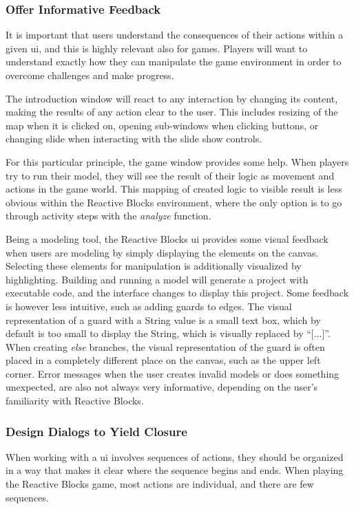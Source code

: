 \subsubsection{Offer Informative Feedback}
It is important that users understand the consequences of their actions within a given \gls{ui}, and this is highly relevant also for games. Players will want to understand exactly how they can manipulate the game environment in order to overcome challenges and make progress.

\noindent
The introduction window will react to any interaction by changing its content, making the results of any action clear to the user. This includes resizing of the map when it is clicked on, opening sub-windows when clicking buttons, or changing slide when interacting with the slide show controls.

\noindent
For this particular principle, the game window provides some help. When players try to run their model, they will see the result of their logic as movement and actions in the game world. This mapping of created logic to visible result is less obvious within the Reactive Blocks environment, where the only option is to go through activity steps with the \emph{analyze} function.

\noindent
Being a modeling tool, the Reactive Blocks \gls{ui} provides some visual feedback when users are modeling by simply displaying the elements on the canvas. Selecting these elements for manipulation is additionally visualized by highlighting. Building and running a model will generate a project with executable code, and the interface changes to display this project. Some feedback is however less intuitive, such as adding guards to edges. The visual representation of a guard with a String value is a small text box, which by default is too small to display the String, which is visually replaced by ``[...]''. When creating \emph{else} branches, the visual representation of the guard is often placed in a completely different place on the canvas, such as the upper left corner. Error messages when the user creates invalid models or does something unexpected, are also not always very informative, depending on the user's familiarity with Reactive Blocks.

\subsubsection{Design Dialogs to Yield Closure}
When working with a \gls{ui} involves sequences of actions, they should be organized in a way that makes it clear where the sequence begins and ends. When playing the Reactive Blocks game, most actions are individual, and there are few sequences.

